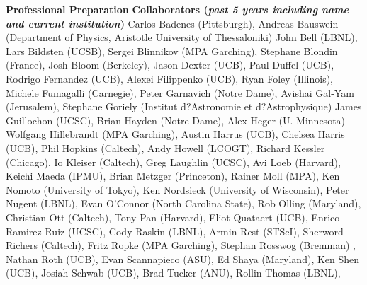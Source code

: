\documentclass[11pt,letterpaper,english]{article}
\begin{document}
\begin{flushleft} {\bf Professional Preparation}
\vspace{-6pt}
{\bf Collaborators ({\emph{past 5 years including name and current institution}})} 
{\parindent 16pt
Carlos Badenes (Pittsburgh),
Andreas Bauswein (Department of Physics, Aristotle University of Thessaloniki)
John Bell (LBNL),
Lars Bildsten (UCSB),
Sergei Blinnikov (MPA Garching),
Stephane Blondin (France),
Josh Bloom (Berkeley),
Jason Dexter (UCB),
Paul Duffel (UCB),
Rodrigo Fernandez (UCB),
Alexei Filippenko (UCB),
Ryan Foley (Illinois),
Michele Fumagalli (Carnegie),
Peter Garnavich (Notre Dame),
Avishai Gal-Yam (Jerusalem), 
Stephane Goriely (Institut d?Astronomie et d?Astrophysique)
James Guillochon (UCSC),
Brian Hayden (Notre Dame),
Alex Heger (U. Minnesota)
Wolfgang Hillebrandt (MPA Garching),
Austin Harrus (UCB),
Chelsea Harris (UCB),
Phil Hopkins (Caltech),
Andy Howell (LCOGT),
Richard Kessler (Chicago),
Io Kleiser (Caltech),
Greg Laughlin (UCSC),
Avi Loeb (Harvard),
Keichi Maeda (IPMU),
Brian Metzger (Princeton),
Rainer Moll (MPA),
Ken Nomoto (University of Tokyo),
Ken Nordsieck (University of Wisconsin),
Peter Nugent (LBNL),
Evan O'Connor (North Carolina State),
Rob Olling (Maryland),
Christian Ott (Caltech),
Tony Pan (Harvard),
Eliot Quataert (UCB),
Enrico Ramirez-Ruiz (UCSC),
Cody Raskin (LBNL),
Armin Rest (STScI),
Sherword Richers (Caltech),
Fritz Ropke (MPA Garching),
Stephan Rosswog (Bremman) ,
Nathan Roth (UCB),
Evan Scannapieco (ASU),
Ed Shaya (Maryland),
Ken Shen (UCB),
Josiah Schwab (UCB),
Brad Tucker (ANU),
Rollin Thomas (LBNL),
}


\end{flushleft}
\end{document}
